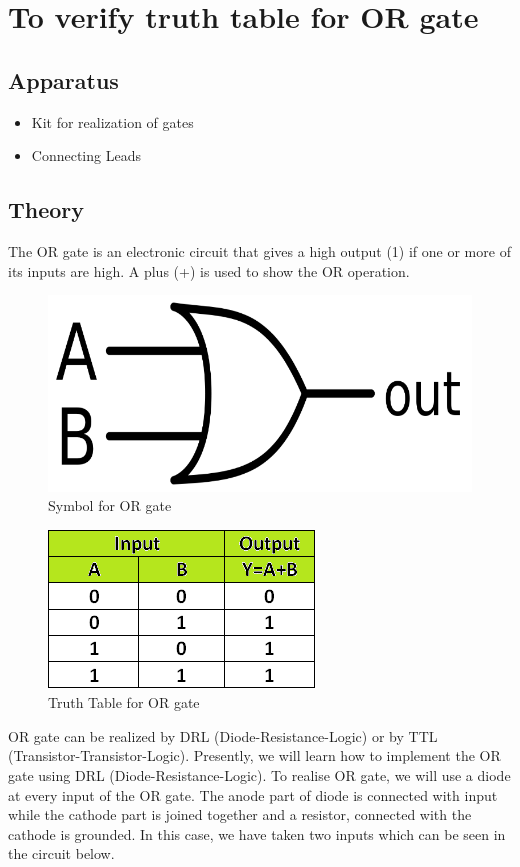 \chapter{To verify truth table for OR gate}


\section{Apparatus}
	\begin{itemize}
		\tightlist
		\item Kit for realization of gates
		\item Connecting Leads
	\end{itemize}

\section{Theory}
	The OR gate is an electronic circuit that gives a high output (1) if one or more of its inputs are high. A plus (+) is used to show the OR operation.
	\begin{figure}[h]
		\centering
		\includegraphics{img/exp2/1}
		\caption{Symbol for OR gate}
		\label{fig:2:1}
	\end{figure}
	\begin{figure}[h]
		\centering
		\includegraphics{img/exp2/2}
		\caption{Truth Table for OR gate}
		\label{fig:2:2}
	\end{figure}
	OR gate can be realized by DRL (Diode-Resistance-Logic) or by TTL (Transistor-Transistor-Logic). Presently, we will learn how to implement the OR gate using DRL (Diode-Resistance-Logic). To realise OR gate, we will use a diode at every input of the OR gate. The anode part of diode is connected with input while the cathode part is joined together and a resistor, connected with the cathode is grounded. In this case, we have taken two inputs which can be seen in the circuit below.
	
